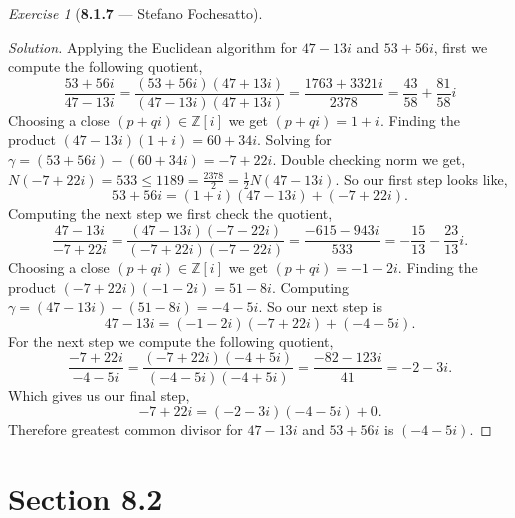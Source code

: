 \documentclass[12pt]{amsart}
\theoremstyle{remark}
\newtheorem*{exercise}{Exercise}%
\newcommand{\ZZ}{{\mathbb Z}}
\theoremstyle{mycomment}
\begin{document}
\begin{exercise}[\textbf{8.1.7} --- Stefano Fochesatto]
\begin{proof}[Solution]
      
      Applying the Euclidean algorithm for $47 - 13i$ and $53 + 56i$, first we compute the following quotient, 
      \begin{equation*}
        \frac{53 + 56i}{47 - 13i} = \frac{(53 + 56i)(47 + 13i)}{(47 - 13i)(47 + 13i)} = \frac{1763 + 3321i}{2378} = \frac{43}{58} + \frac{81}{58}i 
      \end{equation*}
      Choosing a close $(p + qi) \in \ZZ[i]$ we get $(p + qi) = 1 + i$. Finding the product $(47 - 13i)(1 + i) = 60 + 34i$. Solving for $\gamma = (53 + 56i) - (60 + 34i) = -7 + 22i$.
      Double checking norm we get, $N(-7 + 22i) = 533 \leq 1189  = \frac{2378}{2} = \frac{1}{2}N(47 - 13i)$. So our first step looks like, 
      \begin{equation*}
        53 + 56i = (1 + i)(47 - 13i) + (-7 + 22i).
      \end{equation*}
      Computing the next step we first check the quotient, 
      \begin{equation*}
        \frac{47 - 13i}{-7 + 22i} = \frac{(47 - 13i)(-7 - 22i)}{(-7 + 22i)(-7 - 22i)} = \frac{-615 - 943i}{533} = -\frac{15}{13} - \frac{23}{13}i.
      \end{equation*}
      Choosing a close $(p + qi) \in \ZZ[i]$ we get $(p + qi) = -1 - 2i$. Finding the product $(-7 + 22i)( -1 - 2i) = 51 - 8i$. Computing $\gamma = (47 - 13i) - (51 - 8i) = - 4 -5i$.
      So our next step is 
      \begin{equation*}
        47 - 13i = (-1 - 2i)(-7 + 22i) + (-4-5i).
      \end{equation*}
      For the next step we compute the following quotient, 
      \begin{equation*}
        \frac{-7 + 22i}{-4-5i} = \frac{(-7 + 22i)(-4+5i)}{(-4-5i)(-4+5i)} = \frac{-82 - 123 i}{41} = -2 -3i.
      \end{equation*}
      Which gives us our final step, 
      \begin{equation*}
        -7 + 22i = (-2 -3i)(-4-5i) + 0.
      \end{equation*}
      Therefore greatest common divisor for $47 - 13i$ and $53 + 56i$ is $(-4-5i)$.

    \end{proof}

\end{exercise}
\vspace{.5in}

\section*{Section 8.2}
\end{document}
